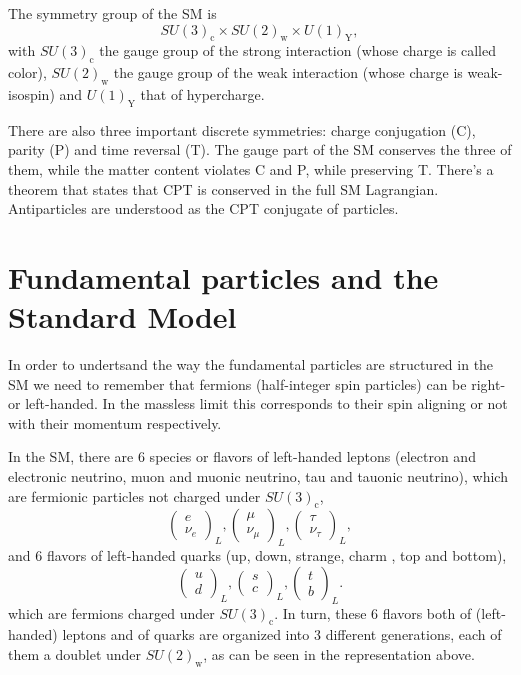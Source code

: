 The symmetry group of the SM is
\begin{equation}
SU(3)_{\textrm{c}}\times SU(2)_{\textrm{w}}\times U(1)_{\textrm{Y}},
\end{equation}
with $SU(3)_{\textrm{c}}$ the gauge group of the strong interaction (whose charge is called color), $SU(2)_{\textrm{w}}$ the gauge group of the weak interaction (whose charge is weak-isospin) and $U(1)_{\textrm{Y}}$ that of hypercharge. 

There are also three important discrete symmetries: charge conjugation (C), parity (P) and time reversal (T). The gauge part of the SM conserves the three of them, while the matter content violates C and P, while preserving T. There's a theorem that states that CPT is conserved in the full SM Lagrangian. Antiparticles are understood as the CPT conjugate of particles.

\section{Fundamental particles and the Standard Model}

In order to undertsand the way the fundamental particles are structured in the SM we need to remember that fermions (half-integer spin particles) can be right- or left-handed. In the massless limit this corresponds to their spin aligning or not with their momentum respectively. 

In the SM, there are 6 species or flavors of left-handed leptons (electron and electronic neutrino, muon and muonic neutrino, tau and tauonic neutrino), which are fermionic particles not charged under $SU(3)_{\textrm{c}}$,
\begin{equation}
\begin{pmatrix}
e\\ 
\nu_e
\end{pmatrix}_L,
\begin{pmatrix}
\mu\\ 
\nu_{\mu}
\end{pmatrix}_L,
\begin{pmatrix}
\tau\\ 
\nu_{\tau}
\end{pmatrix}_L,
\end{equation}
and 6 flavors of left-handed quarks (up, down, strange, charm , top and bottom), 
\begin{equation}
\begin{pmatrix}
u\\ 
d
\end{pmatrix}_L,
\begin{pmatrix}
s\\ 
c
\end{pmatrix}_L,
\begin{pmatrix}
t\\ 
b
\end{pmatrix}_L.
\end{equation}
which are fermions charged under $SU(3)_{\textrm{c}}$. In turn, these 6 flavors both of (left-handed) leptons and of quarks are organized into 3 different generations, each of them a doublet under $SU(2)_{\textrm{w}}$, as can be seen in the representation above.

